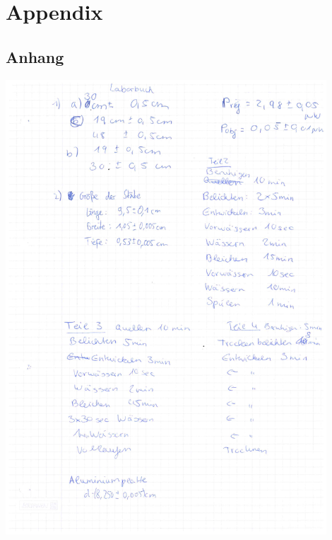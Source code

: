 \section{Appendix}

\subsection{Anhang}

\begin{minipage}{\textwidth}
	\centering
	\includegraphics[width=0.9\textwidth]{../figures/Laborbuch1Holo.pdf}
\end{minipage}

